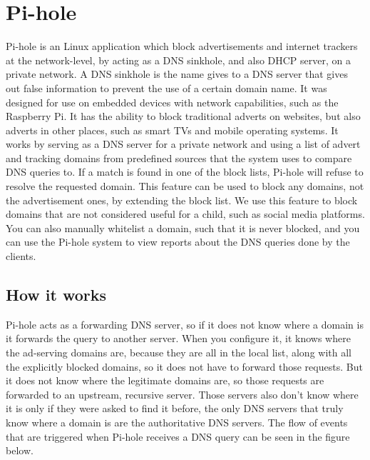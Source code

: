 \section{Pi-hole}

Pi-hole is an Linux application which block advertisements and internet trackers at the network-level, by acting as a DNS sinkhole, and also DHCP server, on a private network. A DNS sinkhole is the name gives to a DNS server that gives out false information to prevent the use of a certain domain name. It was designed for use on embedded devices with network capabilities, such as the Raspberry Pi. It has the ability to block traditional adverts on websites, but also adverts in other places, such as smart TVs and mobile operating systems. It works by serving as a DNS server for a private network and using a list of advert and tracking domains from predefined sources that the system uses to compare DNS queries to. \parencite{salmela2015pihole} If a match is found in one of the block lists, Pi-hole will refuse to resolve the requested domain. This feature can be used to block any domains, not the advertisement ones, by extending the block list. We use this feature to block domains that are not considered useful for a child, such as social media platforms. You can also manually whitelist a domain, such that it is never blocked, and you can use the Pi-hole system to view reports about the DNS queries done by the clients.

\subsection{How it works}

Pi-hole acts as a forwarding DNS server, so if it does not know where a domain is it forwards the query to another server. When you configure it, it knows where the ad-serving domains are, because they are all in the local list, along with all the explicitly blocked domains, so it does not have to forward those requests. But it does not know where the legitimate domains are, so those requests are forwarded to an upstream, recursive server. Those servers also don't know where it is only if they were asked to find it before, the only DNS servers that truly know where a domain is are the authoritative DNS servers. The flow of events that are triggered when Pi-hole receives a DNS query can be seen in the figure below.\parencite{salmela2017ftldns}

